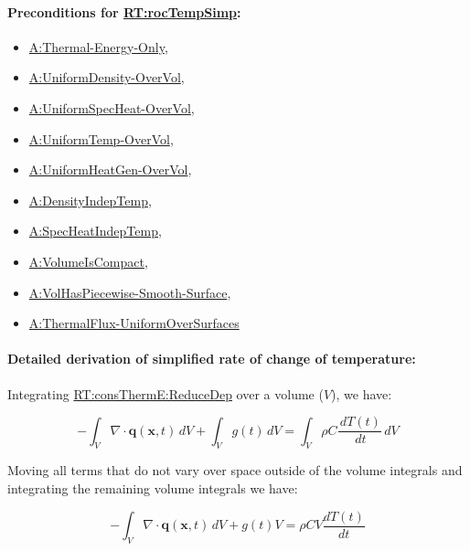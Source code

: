 \documentclass[12pt]{article}
\begin{document}

\paragraph{Preconditions for \hyperref[RT:rocTempSimp]{RT:rocTempSimp}:}
\label{RT:rocTempSimpPrecond}

\begin{itemize}
\item \hyperref[assumpTEO]{A:Thermal-Energy-Only},
\item \hyperref[assumpUnifDens]{A:UniformDensity-OverVol},
\item \hyperref[assumpUnifSpecHeat]{A:UniformSpecHeat-OverVol},
\item \hyperref[assumpUnifTemp]{A:UniformTemp-OverVol},
\item \hyperref[assumpUnifHeatGen]{A:UniformHeatGen-OverVol},
\item \hyperref[assumpDensIndepT]{A:DensityIndepTemp},
\item \hyperref[assumpSpecHeatIndepT]{A:SpecHeatIndepTemp},
\item \hyperref[assumpVolCompact]{A:VolumeIsCompact},
\item \hyperref[assumpPiecewiseSmooth]{A:VolHasPiecewise-Smooth-Surface},
\item \hyperref[assumpUnifThermFlux]{A:ThermalFlux-UniformOverSurfaces}
\end{itemize}


\paragraph{Detailed derivation of simplified rate of change of temperature:}
\label{RT:rocTempSimpDeriv}

Integrating \hyperref[RT:consThermE:ReduceDep]{RT:consThermE:ReduceDep} over a
volume ($V$), we have:

\begin{displaymath}
-\int_{V}{∇\cdot{}\symbf{q}(\textbf{x}, t)}\,dV+\int_{V}{g(t)}\,dV=\int_{V}{ρ C \frac{\,dT(t)}{\,dt}}\,dV
\end{displaymath}

Moving all terms that do not vary over space outside of the volume integrals and
integrating the remaining volume integrals we have:

\begin{displaymath}
-\int_{V}{∇\cdot{}\symbf{q}(\textbf{x}, t)}\,dV + g(t) V=ρ C V \frac{dT(t)}{dt}
\end{displaymath}
\end{document}
